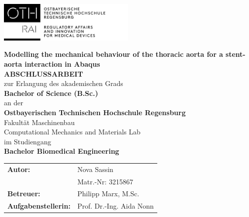 \documentclass[11pt,a4paper,bibliography=totoc,listof=totoc,pointlessnumbers,open=any]{scrbook}
\begin{document}
\pagestyle{scrheadings}

\newpage
\thispagestyle{empty}
\begin{flushleft}
	\includegraphics[width=0.5\textwidth]{Titel/OTH_Logo_RAI.jpg}
\end{flushleft}

\begin{centering}
	\bigskip 
	\bigskip
	\bigskip
	\bigskip		
	\bigskip
	\huge\textrm{\textbf{Modelling the mechanical behaviour of the thoracic aorta for a stent-aorta interaction in Abaqus }}\\
	\bigskip
	\bigskip
	\bigskip 
	\bigskip 
	\bigskip
		\bigskip
		\bigskip 
		\bigskip
		\bigskip
	\LARGE\textrm{\textbf{ABSCHLUSSARBEIT}}\\
	\bigskip
	\small\textrm{zur Erlangung des akademischen Grads}\\
	\smallskip
	\large\textrm{\textbf{\glqq Bachelor of Science (B.Sc.)\grqq}}\\
	\smallskip
	\small\textrm{an der}\\
	\smallskip
	\large\textrm{\textbf{Ostbayerischen Technischen Hochschule Regensburg}}\\
	\smallskip
	\small\textrm{Fakultät Maschinenbau}\\
	\smallskip
	\small\textrm{Computational Mechanics and Materials Lab}\\
	\smallskip
	\small\textrm{im Studiengang}\\
	\smallskip
	\large\textrm{\textbf{Bachelor Biomedical Engineering}}
	\bigskip 
	\bigskip 
	\bigskip
	\bigskip
	\bigskip 
	\bigskip
	\bigskip 
	\bigskip
	\bigskip 
    \begin{table}[H]
    	\flushleft
    	\renewcommand{\arraystretch}{1.2}
    	\begin{tabular}{ll}
    	\textbf{Autor:} & \textrm{Nova Sassin} \\ 
    	 & \textrm{Matr.-Nr: } 3215867 \\
    	\textbf{Betreuer:} & \textrm{Philipp Marx, M.Sc.} \\ 
    	\textbf{Aufgabenstellerin:} & \textrm{Prof. Dr.-Ing. Aida Nonn}
    	\end{tabular}
    \end{table}
\end{centering}

\newpage
\tableofcontents 
\end{document}
